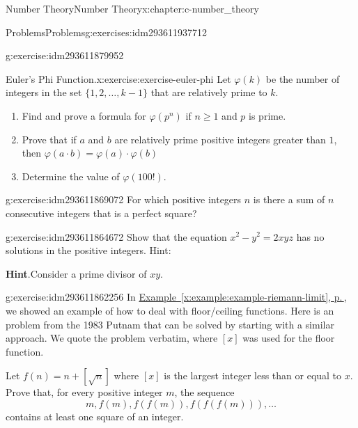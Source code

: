 \documentclass[twoside,10pt,]{book}
\newcommand{\blocktitlefont}{\relax}
\newcommand{\xreffont}{\relax}
\numberwithin{equation}{section}
\begin{document}
\begin{chapterptx}{Number Theory}{}{Number Theory}{}{}{x:chapter:c-number_theory}
\begin{exercises-section}{Problems}{}{Problems}{}{}{g:exercises:idm293611937712}
\begin{divisionexercise}{4}{}{}{g:exercise:idm293611879952}
\end{divisionexercise}%
\begin{divisionexercise}{5}{Euler's Phi Function.}{}{x:exercise:exercise-euler-phi}%
%
Let \(\varphi(k)\) be the number of integers in the set \(\{1,2, \ldots  , k-1\}\) that are relatively prime to \(k\).%
\begin{enumerate}[label=(\alph*)]
\item{}Find and prove a formula for \(\varphi \left(p^n\right)\) if \(n\geq 1\) and \(p\) is prime.%
\item{}Prove that if \(a\) and \(b\) are relatively prime positive integers greater than \(1\), then  \(\varphi(a \cdot b)=\varphi(a) \cdot \varphi(b)\)%
\item{}Determine the value of \(\varphi(100!)\).%
\end{enumerate}
%
\end{divisionexercise}%
\begin{divisionexercise}{6}{}{}{g:exercise:idm293611869072}%
For which positive integers \(n\) is there a sum of \(n\) consecutive integers that is a perfect square?%
\end{divisionexercise}%
\begin{divisionexercise}{7}{}{}{g:exercise:idm293611864672}%
Show that the equation \(x^2- y^2=2x y z\) has no solutions in the positive integers. Hint:%
\par\smallskip%
\noindent\textbf{\blocktitlefont Hint}.\label{g:hint:idm293611863104}{}\hypertarget{g:hint:idm293611863104}{}\quad{}Consider a prime divisor of \(x y\).%
\end{divisionexercise}%
\begin{divisionexercise}{8}{}{}{g:exercise:idm293611862256}%
In \hyperref[x:example:example-riemann-limit]{Example~{\xreffont\ref{x:example:example-riemann-limit}}, p.\,\pageref{x:example:example-riemann-limit}}, we showed an example of how to deal with floor\slash{}ceiling functions. Here is an problem from the 1983 Putnam that can be solved by starting with a similar approach.  We quote the problem verbatim, where \([x]\) was used for the floor function.%
\par
Let \(f(n)=n +[\sqrt{n}]\) where \([x]\) is the largest integer less than or equal to \(x\).  Prove that, for every positive integer \(m\), the sequence%
\begin{equation*}
m, f(m), f(f(m)), f(f(f(m))), \dots
\end{equation*}
contains at least one square of an integer.%
\par\smallskip%

\end{divisionexercise}
\end{exercises-section}
\end{chapterptx}
\end{document}
